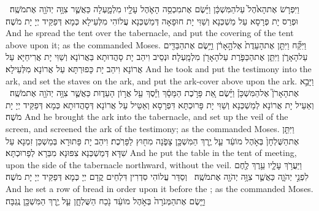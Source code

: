 {וַיִּפְרֹ֤שׂ אֶת\maqqaf הָאֹ֙הֶל֙ עַל\maqqaf הַמִּשְׁכָּ֔ן וַיָּ֜שֶׂם אֶת\maqqaf מִכְסֵ֥ה הָאֹ֛הֶל עָלָ֖יו מִלְמָ֑עְלָה כַּאֲשֶׁ֛ר צִוָּ֥ה יְהֹוָ֖ה אֶת\maqqaf מֹשֶֽׁה׃ \setuma }
{וּפְרַס יָת פְּרָסָא עַל מַשְׁכְּנָא וְשַׁוִּי יָת חוּפָאָה דְּמַשְׁכְּנָא עֲלוֹהִי מִלְּעֵילָא כְּמָא דְּפַקֵּיד יְיָ יָת מֹשֶׁה׃}
{And he spread the tent over the tabernacle, and put the covering of the tent above upon it; as the \lord\space commanded Moses.}{}
{וַיִּקַּ֞ח וַיִּתֵּ֤ן אֶת\maqqaf הָעֵדֻת֙ אֶל\maqqaf הָ֣אָרֹ֔ן וַיָּ֥שֶׂם אֶת\maqqaf הַבַּדִּ֖ים עַל\maqqaf הָאָרֹ֑ן וַיִּתֵּ֧ן אֶת\maqqaf הַכַּפֹּ֛רֶת עַל\maqqaf הָאָרֹ֖ן מִלְמָֽעְלָה׃}
{וּנְסֵיב וִיהַב יָת סָהֲדוּתָא בַּאֲרוֹנָא וְשַׁוִּי יָת אֲרִיחַיָּא עַל אֲרוֹנָא וִיהַב יָת כָּפוּרְתָּא עַל אֲרוֹנָא מִלְּעֵילָא׃}
{And he took and put the testimony into the ark, and set the staves on the ark, and put the ark-cover above upon the ark.}{}
{וַיָּבֵ֣א אֶת\maqqaf הָאָרֹן֮ אֶל\maqqaf הַמִּשְׁכָּן֒ וַיָּ֗שֶׂם אֵ֚ת פָּרֹ֣כֶת הַמָּסָ֔ךְ וַיָּ֕סֶךְ עַ֖ל אֲר֣וֹן הָעֵד֑וּת כַּאֲשֶׁ֛ר צִוָּ֥ה יְהֹוָ֖ה אֶת\maqqaf מֹשֶֽׁה׃ \setuma }
{וְאַעֵיל יָת אֲרוֹנָא לְמַשְׁכְּנָא וְשַׁוִּי יָת פָּרוּכְתָּא דִּפְרָסָא וְאַטֵּיל עַל אֲרוֹנָא דְּסָהֲדוּתָא כְּמָא דְּפַקֵּיד יְיָ יָת מֹשֶׁה׃}
{And he brought the ark into the tabernacle, and set up the veil of the screen, and screened the ark of the testimony; as the \lord\space commanded Moses.}{}
{וַיִּתֵּ֤ן אֶת\maqqaf הַשֻּׁלְחָן֙ בְּאֹ֣הֶל מוֹעֵ֔ד עַ֛ל יֶ֥רֶךְ הַמִּשְׁכָּ֖ן צָפֹ֑נָה מִח֖וּץ לַפָּרֹֽכֶת׃}
{וִיהַב יָת פָּתוּרָא בְּמַשְׁכַּן זִמְנָא עַל שִׁדָּא דְּמַשְׁכְּנָא צִפּוּנָא מִבַּרָא לְפָרוּכְתָּא׃}
{And he put the table in the tent of meeting, upon the side of the tabernacle northward, without the veil.}{}
{וַיַּעֲרֹ֥ךְ עָלָ֛יו עֵ֥רֶךְ לֶ֖חֶם לִפְנֵ֣י יְהֹוָ֑ה כַּאֲשֶׁ֛ר צִוָּ֥ה יְהֹוָ֖ה אֶת\maqqaf מֹשֶֽׁה׃ \setuma }
{וְסַדַּר עֲלוֹהִי סִדְרִין דִּלְחֵים קֳדָם יְיָ כְּמָא דְּפַקֵּיד יְיָ יָת מֹשֶׁה׃}
{And he set a row of bread in order upon it before the \lord; as the \lord\space commanded Moses.}{}
{וַיָּ֤שֶׂם אֶת\maqqaf הַמְּנֹרָה֙ בְּאֹ֣הֶל מוֹעֵ֔ד נֹ֖כַח הַשֻּׁלְחָ֑ן עַ֛ל יֶ֥רֶךְ הַמִּשְׁכָּ֖ן נֶֽגְבָּה׃}
